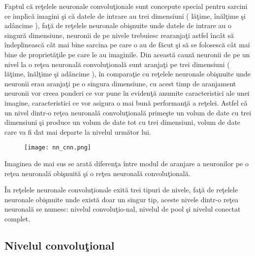 \par

Faptul c\u{a} re\c{t}elele neuronale convolu\c{t}ionale sunt concepute special pentru sarcini ce implic\u{a} imagini \c{s}i c\u{a} datele de intrare  au trei dimensiuni ( l\u{a}\c{t}ime, \^{i}n\u{a}l\c{t}ime \c{s}i ad\^{a}ncime ),  fa\c{t}\u{a} de re\c{t}elele neuronale obi\c{s}nuite unde datele de intrare au o singur\u{a} dimensiune, neuronii de pe nivele trebuiesc rearanja\c{t}i astfel \^{i}nc\^{a}t s\u{a} \^{i}ndeplineasc\u{a} c\^{a}t mai bine sarcina pe care o au de f\u{a}cut \c{s}i s\u{a} se folosesc\u{a} c\^{a}t mai bine de propriet\u{a}\c{t}ile pe care le au imaginile. Din aceast\u{a} cauz\u{a} neuronii de pe un nivel la o re\c{t}ea neuronal\u{a} convolu\c{t}ional\u{a} sunt aranja\c{t}i pe trei dimensiuni ( l\u{a}\c{t}ime, \^{i}n\u{a}l\c{t}ime \c{s}i ad\^{a}ncime ), \^{i}n compara\c{t}ie cu re\c{t}elele neuronale obi\c{s}nuite unde neuronii erau aranja\c{t}i pe o singura dimensiune, cu acest timp de aranjament neuronii vor creea ponderi ce vor pune \^{i}n eviden\c{t}\u{a} anumite caracteristici ale unei imagine, caracteristici ce vor asigura o mai bun\u{a} performan\c{t}\u{a} a re\c{t}elei. Astfel c\u{a} un nivel dintr-o re\c{t}ea neuronal\u{a} convolu\c{t}ional\u{a} prime\c{s}te un volum de date cu trei dimensiuni \c{s}i produce un volum de date tot cu trei dimensiuni, volum de date care va fi dat mai departe la nivelul urm\u{a}tor lui.

\par 

\begin{figure}[h!]
  \centering
  \texttt{[image: nn\_cnn.png]}
\end{figure}

Imaginea de mai sus se arat\u{a} diferen\c{t}a \^{i}ntre modul de aranjare a neuronilor pe o re\c{t}ea neuronal\u{a} obi\c{s}nuit\u{a} \c{s}i o re\c{t}ea neuronal\u{a} convolu\c{t}ional\u{a}.

\^{I}n re\c{t}elele neuronale convolu\c{t}ionale exit\u{a} trei tipuri de nivele, fa\c{t}\u{a} de re\c{t}elele neuronale obi\c{s}nuite unde exist\u{a} doar un singur tip, aceste nivele dintr-o re\c{t}ea neuronal\u{a} se numesc: nivelul convolu\c{t}io-nal, nivelul de pool \c{s}i nivelul conectat complet.

\subsection{Nivelul convolu\c{t}ional}

